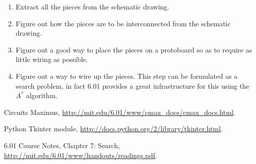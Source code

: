 \documentclass[12pt, doublespacing]{amsart}
\begin{document}
\begin{enumerate}
\item Extract all the pieces from the schematic drawing.
\item Figure out how the pieces are to be interconnected from the schematic drawing.
\item Figure out a good way to place the pieces on a protoboard so as to require as little wiring as possible.
\item Figure out a way to wire up the pieces. This step can be formulated as a search problem, in fact 6.01 provides a great infrastructure for this using the $A^*$ algorithm\cite{6.01search}.
\end{enumerate}

\begin{thebibliography}{9}

Circuits Maximus,
\url{http://mit.edu/6.01/www/cmax_docs/cmax_docs.html}.

Python Tkinter module, \url{http://docs.python.org/2/library/tkinter.html}.

6.01 Course Notes, Chapter 7: Search, \url{http://mit.edu/6.01/www/handouts/readings.pdf}.

\end{thebibliography}
\end{document}
